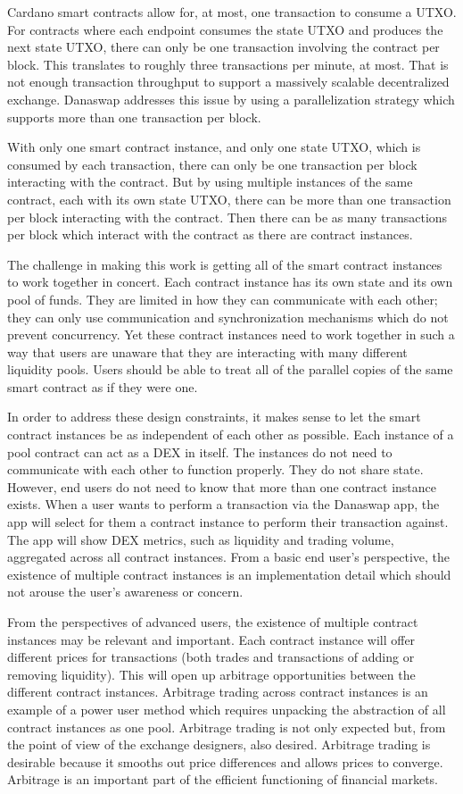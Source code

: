 \documentclass[12pt]{article}
\begin{document}
Cardano smart contracts allow for, at most, one transaction to consume a UTXO. For contracts where each endpoint consumes the state UTXO and produces the next state UTXO, there can only be one transaction involving the contract per block. This translates to roughly three transactions per minute, at most. That is not enough transaction throughput to support a massively scalable decentralized exchange. Danaswap addresses this issue by using a parallelization strategy which supports more than one transaction per block.

With only one smart contract instance, and only one state UTXO, which is consumed by each transaction, there can only be one transaction per block interacting with the contract. But by using multiple instances of the same contract, each with its own state UTXO, there can be more than one transaction per block interacting with the contract. Then there can be as many transactions per block which interact with the contract as there are contract instances.

The challenge in making this work is getting all of the smart contract instances to work together in concert. Each contract instance has its own state and its own pool of funds. They are limited in how they can communicate with each other; they can only use communication and synchronization mechanisms which do not prevent concurrency. Yet these contract instances need to work together in such a way that users are unaware that they are interacting with many different liquidity pools. Users should be able to treat all of the parallel copies of the same smart contract as if they were one.

In order to address these design constraints, it makes sense to let the smart contract instances be as independent of each other as possible. Each instance of a pool contract can act as a DEX in itself. The instances do not need to communicate with each other to function properly. They do not share state. However, end users do not need to know that more than one contract instance exists. When a user wants to perform a transaction via the Danaswap app, the app will select for them a contract instance to perform their transaction against. The app will show DEX metrics, such as liquidity and trading volume,
aggregated across all contract instances. From a basic end user's perspective, the existence of multiple contract instances is an implementation
detail which should not arouse the user's awareness or concern.

From the perspectives of advanced users, the existence of multiple contract instances may be relevant and important. Each contract instance will offer
different prices for transactions (both trades and transactions of adding or removing liquidity). This will open up arbitrage opportunities between
the different contract instances. Arbitrage trading across contract instances is an example of a power user method which requires unpacking the abstraction of all contract instances as one pool. Arbitrage trading is not only expected but, from the point of view of
the exchange designers, also desired. Arbitrage trading is desirable because it smooths out price differences and allows prices to
converge. Arbitrage is an important part of the efficient functioning of financial markets.
\end{document}
